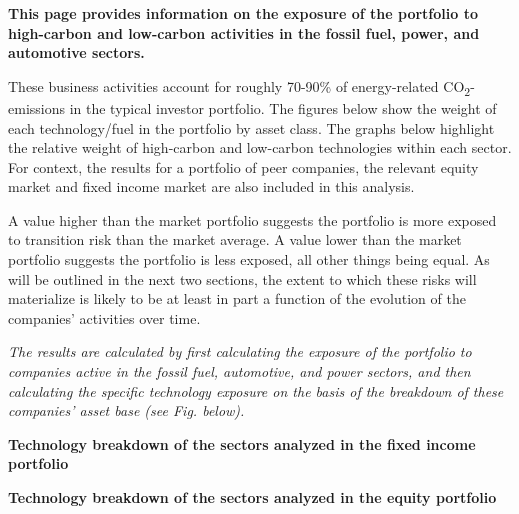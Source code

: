 \documentclass[10pt,table,a4]{article}\usepackage[]{graphicx}\usepackage[]{color}
\begin{document}
	\begin{multicols}{2}
		
		
		\textbf{This page provides information on the exposure of the portfolio to high-carbon and low-carbon activities in the fossil fuel, power, and automotive sectors. }
		
		These business activities account for roughly 70-90\% of energy-related CO\textsubscript{2}-emissions in the typical investor portfolio. The figures below show the weight of each technology/fuel in the portfolio by asset class. The graphs below highlight the relative weight of high-carbon and low-carbon technologies within each sector. For context, the results for a portfolio of peer companies, the relevant equity market and fixed income market are also included in this analysis.
		
		A value higher than the market portfolio suggests the portfolio is more exposed to transition risk than the market average. A value lower than the market portfolio suggests the portfolio is less exposed, all other things being equal. As will be outlined in the next two sections, the extent to which these risks will materialize is likely to be at least in part a function of the evolution of the companies’ activities over time. 
		
		\textit{The results are calculated by first calculating the exposure of the portfolio to companies active in the fossil fuel, automotive, and power sectors, and then calculating the specific technology exposure on the basis of the breakdown of these companies’ asset base (see Fig. below). }
		
		\vspace{-0.1cm}
		
	\end{multicols}
	
	\vspace{-0.4cm}
	
	\textbf{Technology breakdown of the sectors analyzed in the fixed income portfolio} %
	
	\vspace{-0.2cm}
	
	
	
	\textbf{Technology breakdown of the sectors analyzed in the equity portfolio} %
	
	\vspace{-0.2cm}
	
\end{document}
